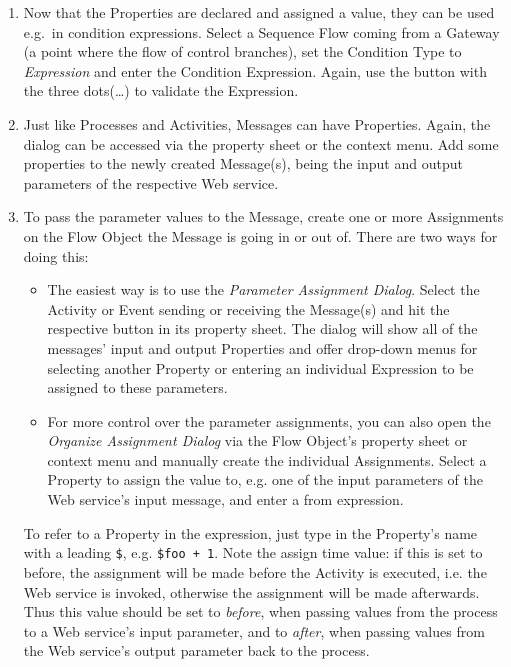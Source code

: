 \begin{enumerate}
	\item Now that the Properties are declared and assigned a value, they can be
	used e.g.\ in condition expressions.  Select a Sequence Flow coming from a
	Gateway (a point where the flow of control branches), set the Condition Type
	to \emph{Expression} and enter the Condition Expression.  Again, use the
	button with the three dots(\dots) to validate the Expression.
	
	\item Just like Processes and Activities, Messages can have Properties.
	Again, the dialog can be accessed via the property sheet or the context menu.
	Add some properties to the newly created Message(s), being the input and
	output parameters of the respective Web service.
	
	\item To pass the parameter values to the Message, create one or more
	Assignments on the Flow Object the Message is going in or out of.  There are
	two ways for doing this:
	\begin{itemize}
		\item The easiest way is to use the \emph{Parameter Assignment Dialog}.
		Select the Activity or Event sending or receiving the Message(s) and hit
		the respective button in its property sheet.  The dialog will show all of
		the messages' input and output Properties and offer drop-down menus for
		selecting another Property or entering an individual Expression to be
		assigned to these parameters.
		
		\item For more control over the parameter assignments, you can also open
		the \emph{Organize Assignment Dialog} via the Flow Object's property sheet
		or context menu and manually create the individual Assignments.  Select
		a Property to assign the value to, e.g. one of the input parameters of
		the Web service's input message, and enter a from expression.
	\end{itemize}
	 To refer to a Property in the expression, just type in the Property's name
	 with a leading \verb|$|, e.g. \verb|$foo + 1|.  Note the assign time value:
	 if this is set to before, the assignment will be made before the Activity is
	 executed, i.e. the Web service is invoked, otherwise the assignment will be
	 made afterwards.  Thus this value should be set to \emph{before}, when
	 passing values from the process to a Web service's input parameter, and to
	 \emph{after}, when passing values from the Web service's output parameter
	 back to the process.
\end{enumerate}



